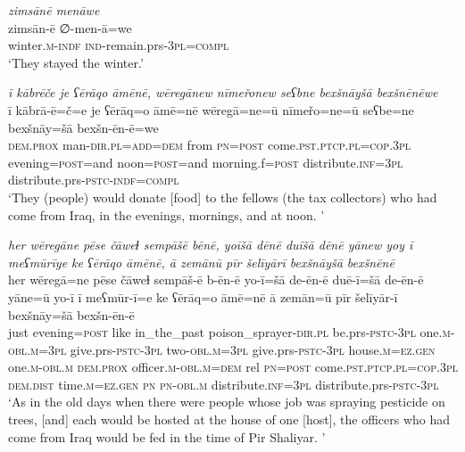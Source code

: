 \ea \label{BP.37}
\textit{zimsānē menāwe} \\ 
\gll zimsān-ē ∅-men-ā=we \\ 
 winter\textsc{.m}\textsc{-indf} \textsc{ind-}remain.prs\textsc{-3pl}\textsc{=compl} \\ 
\glt `They stayed the winter.'
\z 
 
\ea \label{BP.38}
\textit{ī kābrēče je ʕērāqo āmēnē, wēregānew nīmeřonew seʕbne bexšnāyšā bexšnēnēwe} \\ 
\gll ī kābrā-ē=č=e je ʕērāq=o āmē=nē wēregā=ne=ū nīmeřo=ne=ū seʕbe=ne bexšnāy=šā bexšn-ēn-ē=we \\ 
 \textsc{dem.prox} man\textsc{-dir}\textsc{.pl}\textsc{=add}\textsc{=dem} from \textsc{pn}\textsc{=\textsc{post}} come\textsc{.pst}\textsc{.ptcp}\textsc{.pl}\textsc{=cop}\textsc{.3pl} evening\textsc{=\textsc{post}}=and noon\textsc{=\textsc{post}}=and morning.f\textsc{=\textsc{post}} distribute\textsc{.inf}\textsc{=3pl} distribute.prs\textsc{-pstc}\textsc{-indf}\textsc{=compl} \\ 
\glt `They (people) would donate [food] to the fellows (the tax collectors) who had come from Iraq, in the evenings, mornings, and at noon. '
\z 
 
\ea \label{BP.40}
\textit{her wēregāne pēse čāweɫ sempāšē bēnē, yoīšā dēnē duīšā dēnē yānew yoy ī meʕmūrīye ke ʕērāqo āmēnē, ā zemānū pīr šelīyārī bexšnāyšā bexšnēnē} \\ 
\gll her wēregā=ne pēse čāweɫ sempāš-ē b-ēn-ē yo-ī=šā de-ēn-ē duē-ī=šā de-ēn-ē yāne=ū yo-ī ī meʕmūr-ī=e ke ʕērāq=o āmē=nē ā zemān=ū pīr šelīyār-ī bexšnāy=šā bexšn-ēn-ē \\ 
 just evening\textsc{=\textsc{post}} like in\_the\_past poison\_sprayer\textsc{-dir}\textsc{.pl} be.prs\textsc{-pstc}\textsc{-3pl} one\textsc{.m}\textsc{-obl}\textsc{.m}\textsc{=3pl} give.prs\textsc{-pstc}\textsc{-3pl} two\textsc{-obl}\textsc{.m}\textsc{=3pl} give.prs\textsc{-pstc}\textsc{-3pl} house\textsc{.m}\textsc{=ez.gen} one\textsc{.m}\textsc{-obl}\textsc{.m} \textsc{dem.prox} officer\textsc{.m}\textsc{-obl}\textsc{.m}\textsc{=dem} rel \textsc{pn}\textsc{=\textsc{post}} come\textsc{.pst}\textsc{.ptcp}\textsc{.pl}\textsc{=cop}\textsc{.3pl} \textsc{dem.dist} time\textsc{.m}\textsc{=ez.gen} \textsc{pn} \textsc{pn}\textsc{-obl}\textsc{.m} distribute\textsc{.inf}\textsc{=3pl} distribute.prs\textsc{-pstc}\textsc{-3pl} \\ 
\glt `As in the old days when there were people whose job was spraying pesticide on trees, [and] each would be hosted at the house of one [host], the officers who had come from Iraq would be fed in the time of Pir Shaliyar. '
\z 
 
